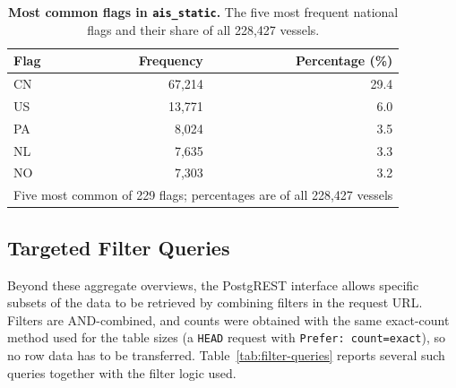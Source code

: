 \documentclass[10pt,a4paper]{article}
\begin{document}
\begin{table}[ht]
\caption{\textbf{Most common flags in \texttt{ais\_static}.} The five most frequent national flags and their share of all 228,427 vessels.}
\label{tab:overview-flags}
\vspace{0.2cm}
\centering
\small
\begin{tabular}{@{}lrr@{}}
\toprule
{\bfseries Flag} & {\bfseries Frequency} & {\bfseries Percentage (\%)} \\
\midrule
CN & 67,214 & 29.4 \\
US & 13,771 &  6.0 \\
PA &  8,024 &  3.5 \\
NL &  7,635 &  3.3 \\
NO &  7,303 &  3.2 \\
\midrule
\multicolumn{3}{l}{Five most common of 229 flags; percentages are of all 228,427 vessels} \\
\bottomrule
\end{tabular}
\end{table}


\subsection{Targeted Filter Queries}

Beyond these aggregate overviews, the PostgREST interface allows specific subsets of
the data to be retrieved by combining filters in the request URL. Filters are
AND-combined, and counts were obtained with the same exact-count method used for the
table sizes (a \texttt{HEAD} request with \texttt{Prefer: count=exact}), so no row data
has to be transferred. Table~\ref{tab:filter-queries} reports several such queries
together with the filter logic used.
\end{document}

